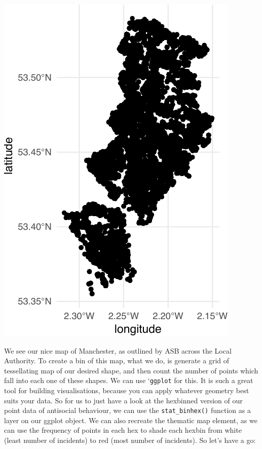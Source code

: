 \documentclass[
  krantz2]{krantz}
\begin{document}
\includegraphics{crime_mapping_files/figure-latex/unnamed-chunk-124-1.pdf}

We see our nice map of Manchester, as outlined by ASB across the Local Authority. To create a bin of this map, what we do, is generate a grid of tessellating map of our desired shape, and then count the number of points which fall into each one of these shapes. We can use `\texttt{ggplot} for this. It is such a great tool for building visualisations, because you can apply whatever geometry best suits your data. So for us to just have a look at the hexbinned version of our point data of antisocial behaviour, we can use the \texttt{stat\_binhex()} function as a layer on our ggplot object. We can also recreate the thematic map element, as we can use the frequency of points in each hex to shade each hexbin from white (least number of incidents) to red (most number of incidents). So let's have a go:
\end{document}
